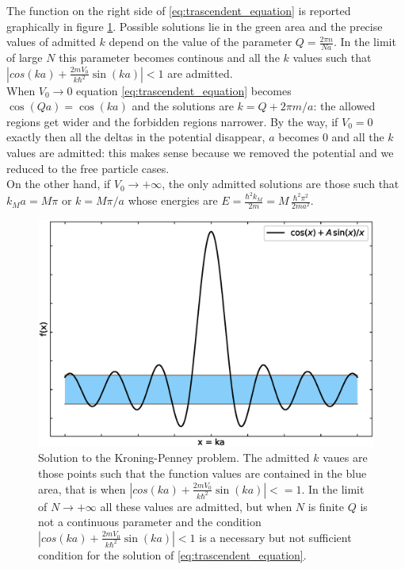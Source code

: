 \documentclass{article}
\begin{document}
The function on the right side of \ref{eq:trascendent_equation} is reported graphically in figure \ref{fig:trascendent_equation}. Possible solutions lie in the green area and the precise values of admitted $k$
depend on the value of the parameter $Q = \frac{2\pi n}{Na}$. In the limit of large $N$ this parameter becomes continous and all the $k$ values such that $|cos(ka) + \frac{2mV_0}{k\hbar^2} \sin(ka)| < 1$ are admitted. \\
When $V_0 \to 0$ equation \ref{eq:trascendent_equation} becomes $\cos(Qa) = \cos(ka)$ and the solutions are $k = Q + 2\pi m/a$: the allowed regions get wider and the forbidden regions narrower. By the way, if $V_0=0$ exactly then all the deltas in the potential 
disappear, $a$ becomes $0$ and all the $k$ values are admitted: this makes sense because we removed the potential and we reduced to the free particle cases. \\
On the other hand, if $V_0 \to +\infty$, the only admitted solutions are those such that $k_Ma = M\pi$ or $k = M\pi/a$ whose energies are $E = \frac{\hbar^2 k_M}{2m} = M \, \frac{\hbar^2\pi^2}{2m a^2}$.
\begin{figure}[hbp]
    \centering
    \includegraphics[scale=0.5]{scripts/trascendent.eps}
    \caption{Solution to the Kroning-Penney problem. The admitted $k$ vaues are those points such that the function values are contained in the blue area, that is when $|cos(ka) + \frac{2mV_0}{k\hbar^2} \sin(ka)| <= 1$. In the limit of 
    $N \to +\infty$ all these values are admitted, but when $N$ is finite $Q$ is not a continuous parameter and the condition $|cos(ka) + \frac{2mV_0}{k\hbar^2} \sin(ka)| < 1$ is a necessary but not sufficient condition for the solution of \ref{eq:trascendent_equation}.}
    \label{fig:trascendent_equation}
\end{figure}
\end{document}
